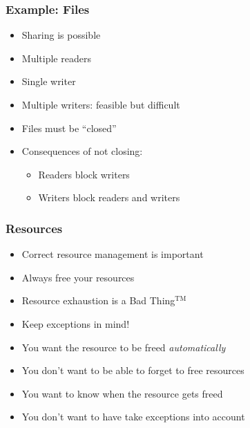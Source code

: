 \begin{frame}
  \frametitle{Example: Files}
  \begin{itemize}
    \item Sharing is possible
    \item Multiple readers
    \item Single writer
    \item Multiple writers: feasible but difficult
    \item Files must be ``closed''
    \item Consequences of not closing:
          \begin{itemize}
            \item Readers block writers
            \item Writers block readers and writers
          \end{itemize}
  \end{itemize}
\end{frame}

\begin{frame}
  \frametitle{Resources}
  \begin{itemize}
    \item Correct resource management is important
    \item Always free your resources
    \item Resource exhaustion is a Bad Thing$^{\textrm{TM}}$
    \item Keep exceptions in mind!
  \end{itemize}
  \vskip5mm
  \begin{itemize}
    \item You want the resource to be freed \emph{automatically}
    \item You don't want to be able to forget to free resources
    \item You want to know when the resource gets freed
    \item You don't want to have take exceptions into account
  \end{itemize}
\end{frame}


